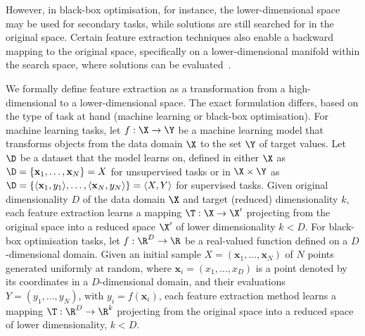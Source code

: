 However, in black-box optimisation, for instance, the lower-dimensional space may be used for secondary tasks, while solutions are still searched for in the original space. 
Certain feature extraction techniques 
also
enable a backward mapping to the original space, specifically on a lower-dimensional manifold within the search space, where solutions can be evaluated~\citep{RapEtAl20}.


We formally define feature extraction as a transformation from a high-dimensional to a lower-dimensional space.
The exact formulation differs, based on the type of task at hand (machine learning or black-box optimisation).
For machine learning tasks, let $f: \X \rightarrow \Y $ be a machine learning model that transforms objects from the data domain $\X$ to the set $\Y$ of target values. 
Let $\D$ be a dataset that the model learns on, defined in either $\X$ as $\D = \{ \mathbf{x}_1, \dots, \mathbf{x}_N \} = X$ for unsupervised tasks or in $\X \times \Y$ as $\D = \{ \langle\mathbf{x}_1,y_1\rangle, \dots, \langle\mathbf{x}_N,y_N\rangle \} = \langle X,Y \rangle$ for supervised tasks.
Given original dimensionality $D$ of the data domain $\X$ and target (reduced) dimensionality $k$, each feature extraction learns a mapping $\T : \X \rightarrow \X'$ projecting from the original space into a reduced space $\X'$ of lower dimensionality $k < D$.
For black-box optimisation tasks, let $f: \R^D \rightarrow \R$ be a real-valued function defined on a $D$-dimensional domain. Given an initial sample $X = (\mathbf{x}_1, \dots, \mathbf{x}_N)$
of $N$ points generated uniformly at random, where $\mathbf{x}_i = (x_1, \dots, x_D)$ is a point denoted by its coordinates in a $D$-dimensional domain,
and their evaluations $Y = ({y}_1, \dots, {y}_N)$,
with ${y}_i = f(\mathbf{x}_i)$, 
each feature extraction method learns a mapping $\T: \R^D \rightarrow \R^k$ projecting from the original space into a reduced space of lower dimensionality, $k<D$.























































